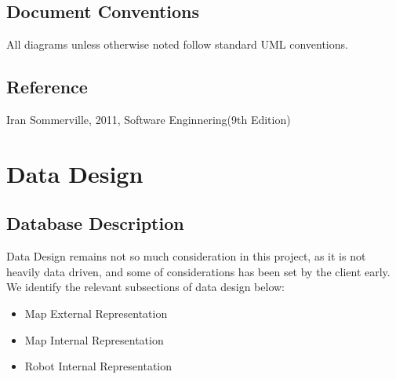 \documentclass[11pt, a4paper,titlepage]{article}
\begin{document}
    \subsection{Document Conventions}
All diagrams unless otherwise noted follow standard UML conventions.

\subsection{Reference}
Iran Sommerville, 2011, Software Enginnering(9th Edition) 


     \vspace{3cm}
    
  \newpage
  \section{Data Design}
    \subsection{Database Description}
    Data Design remains not so much consideration in this project, as it is not heavily data driven, and some of considerations has been set by the client early. We identify the relevant subsections of data design below:
    \begin{itemize}
    \item Map External Representation
    \item Map Internal Representation
    \item Robot Internal Representation
    \end{itemize}
\end{document}

